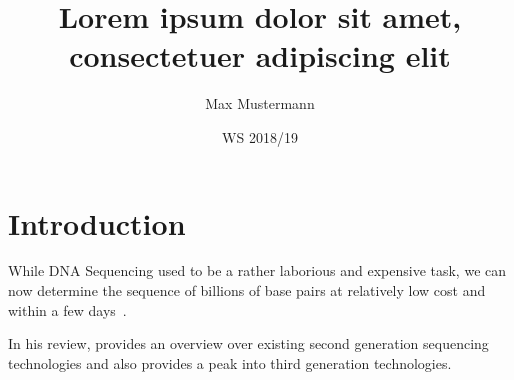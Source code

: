 \documentclass[american, a4paper, 12pt]{scrartcl}
\title{Lorem ipsum dolor sit amet, consectetuer adipiscing elit}
\date{WS 2018/19}
\author{Max Mustermann}
\newcommand\randomtext[1]{\textcolor{gray!80}{\lipsum[#1]}}
\begin{document}
\maketitle

\begin{abstract}
    \randomtext{1-2}
\end{abstract}

\section{Introduction}
\label{sec:einleitung}




While DNA Sequencing used to be a rather laborious and expensive task, we can now determine the
sequence of billions of base pairs at relatively low cost and within a few
days~\cite{Metzker2010,Schadt2010}. 
\randomtext{3}


In his review, \citet{Metzker2010} provides an overview over existing second generation sequencing
technologies and also provides a peak into third generation technologies.
\randomtext{4}


%
\end{document}
